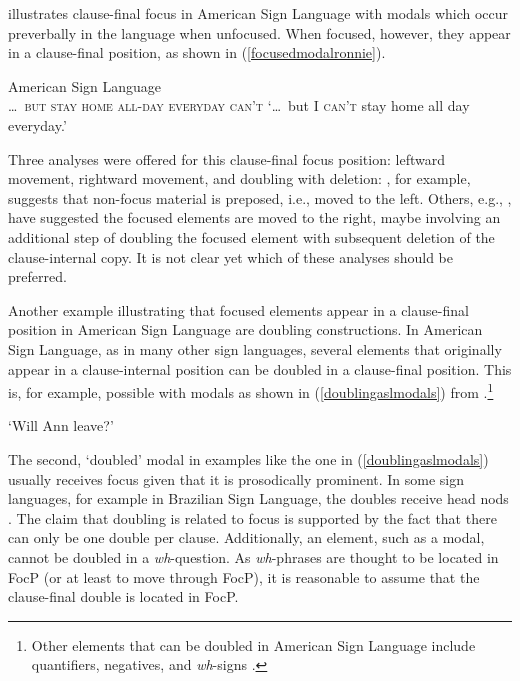 \citet[92]{wilbur1997prosodic} illustrates clause-final focus in American Sign Language with modals which occur preverbally in the language when unfocused. When focused, however, they appear in a clause-final position, as shown in (\ref{focusedmodalronnie}).

\begin{exe}
\ex American Sign Language \citep[92]{wilbur1997prosodic} \\ %
{\textsc{\dots\ but stay home all-day everyday can't}}
\glt `\dots\ but I \textsc{can't} stay home all day everyday.' \label{focusedmodalronnie}
\end{exe}

\noindent Three analyses were offered for this clause-final focus position: leftward movement, rightward movement, and  doubling with deletion: \citet{wilbur1997prosodic}, for example, suggests that non-focus material is preposed, i.e., moved to the left. Others, e.g., \citet{petronio1993clause}, have suggested the focused elements are moved to the right, maybe involving an additional step of doubling the focused element with subsequent deletion of the clause-internal copy. It is not clear yet which of these analyses should be preferred.  

Another example illustrating that focused elements appear in a clause-final position in American Sign Language are doubling constructions. In American Sign Language, as in many other sign languages, several elements that originally appear in a clause-internal position can be doubled in a clause-final position. This is, for example, possible with modals as shown in (\ref{doublingaslmodals}) from \citet[135]{petronio1993clause}.\footnote{Other elements that can be doubled in American Sign Language include quantifiers, negatives, and \textit{wh}-signs \citep{petronio1993clause}.}

\begin{exe}
\ex {}
\glt `Will Ann leave?' \label{doublingaslmodals}
\end{exe}

\noindent The second, `doubled' modal in examples like the one in (\ref{doublingaslmodals}) usually receives focus given that it is prosodically prominent. In some sign languages, for example in Brazilian Sign Language, the doubles receive head nods \citep{de1999phrase}. The claim that doubling is related to focus is supported by the fact that there can only be one double per clause. Additionally, an element, such as a modal, cannot be doubled in a \textit{wh}-question. As \textit{wh}-phrases are thought to be located in FocP (or at least to move through FocP), it is reasonable to assume that the clause-final double is located in FocP. 

